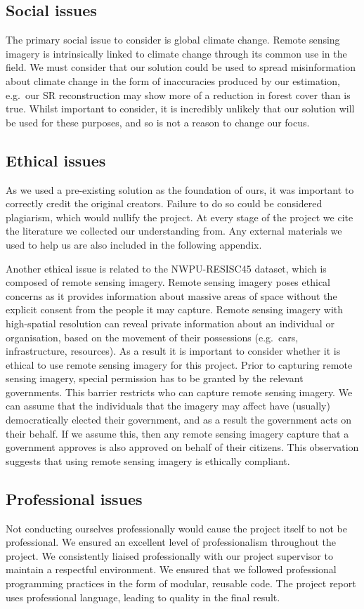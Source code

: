 \begin{appendices}
\subsection{Social issues}
The primary social issue to consider is global climate change. Remote sensing imagery is intrinsically linked to climate change through its common use in the field. We must consider that our solution could be used to spread misinformation about climate change in the form of inaccuracies produced by our estimation, e.g.\ our SR reconstruction may show more of a reduction in forest cover than is true. Whilst important to consider, it is incredibly unlikely that our solution will be used for these purposes, and so is not a reason to change our focus.

\subsection{Ethical issues}
As we used a pre-existing solution as the foundation of ours, it was important to correctly credit the original creators. Failure to do so could be considered plagiarism, which would nullify the project. At every stage of the project we cite the literature we collected our understanding from. Any external materials we used to help us are also included in the following appendix.

Another ethical issue is related to the NWPU-RESISC45 dataset, which is composed of remote sensing imagery. Remote sensing imagery poses ethical concerns as it provides information about massive areas of space without the explicit consent from the people it may capture. Remote sensing imagery with high-spatial resolution can reveal private information about an individual or organisation, based on the movement of their possessions (e.g.\ cars, infrastructure, resources). As a result it is important to consider whether it is ethical to use remote sensing imagery for this project. Prior to capturing remote sensing imagery, special permission has to be granted by the relevant governments. This barrier restricts who can capture remote sensing imagery. We can assume that the individuals that the imagery may affect have (usually) democratically elected their government, and as a result the government acts on their behalf. If we assume this, then any remote sensing imagery capture that a government approves is also approved on behalf of their citizens. This observation suggests that using remote sensing imagery is ethically compliant.

\subsection{Professional issues}
Not conducting ourselves professionally would cause the project itself to not be professional. We ensured an excellent level of professionalism throughout the project. We consistently liaised professionally with our project supervisor to maintain a respectful environment. We ensured that we followed professional programming practices in the form of modular, reusable code. The project report uses professional language, leading to quality in the final result.


\end{appendices}

